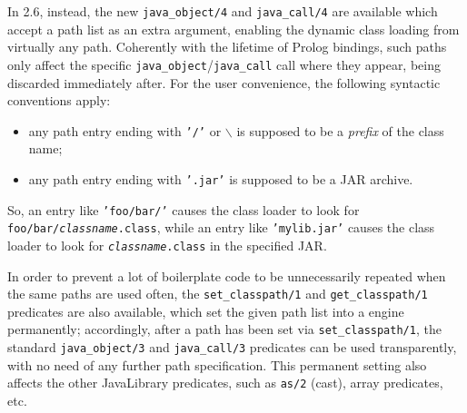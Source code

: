 
In \tuprolog{} 2.6, instead, the new \texttt{java\_object/4} and \texttt{java\_call/4} are available which accept a path list as an extra argument, enabling the dynamic class loading from virtually any path. Coherently with the lifetime of Prolog bindings, such paths only affect the specific \texttt{java\_object}/\texttt{java\_call} call where they appear, being discarded immediately after.
For the user convenience, the following syntactic conventions apply:
\begin{itemize}
  \item any path entry ending with \texttt{'/'} or \texttt{$\backslash$} is supposed to be a \textit{prefix} of the class name;
  \item any path entry ending with \texttt{'.jar'} is supposed to be a JAR archive.
\end{itemize}
\noindent So, an entry like \texttt{'foo/bar/'} causes the \tuprolog{} class loader to look for \texttt{foo/bar/\textit{classname}.class}, while an entry like \texttt{'mylib.jar'} causes the \tuprolog{} class loader to look for \texttt{\textit{classname}.class} in the specified JAR.

In order to prevent a lot of boilerplate code to be unnecessarily repeated when the same paths are used often, the \texttt{set\_classpath/1} and \texttt{get\_classpath/1} predicates are also available, which set the given path list into a \tuprolog{} engine permanently; accordingly, after a path has been set via \texttt{set\_classpath/1}, the standard \texttt{java\_object/3} and \texttt{java\_call/3} predicates can be used transparently, with no need of any further path specification.
This permanent setting also affects the other JavaLibrary predicates, such as \texttt{as/2} (cast), array predicates, etc.
